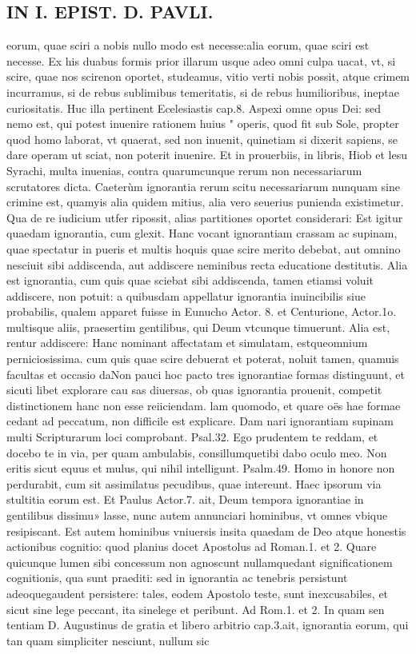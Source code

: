 \documentclass{article}
\begin{document}
\begin{pages}
\section*{IN I. EPIST. D. PAVLI. }
\marginpar{[ p.41 ]}\pstart eorum, quae sciri a nobis nullo modo est necesse:alia eorum, quae sciri est necesse. Ex his duabus formis prior illarum usque  adeo omni culpa uacat, vt, si scire, quae nos scirenon oportet, studeamus, vitio verti nobis possit, atque  crimem incurramus, si de rebus sublimibus temeritatis, si de rebus humilioribus, ineptae curiositatis. Huc illa pertinent Ecelesiastis cap.8. Aspexi omne opus Dei: sed nemo est, qui potest inuenire rationem huius " operis, quod fit sub Sole, propter quod homo laborat, vt quaerat, sed non inuenit, quinetiam si dixerit sapiens, se dare operam ut sciat, non poterit inuenire. Et in prouerbiis, in libris, Hiob et lesu Syrachi, multa inuenias, contra quarumcunque  rerum non necessariarum scrutatores dicta.  \pend\pstart Caeterùm ignorantia rerum scitu necessariarum nunquam sine crimine est, quamyis alia quidem mitius, alia vero seuerius punienda existimetur. Qua de re iudicium utfer ripossit, alias partitiones oportet considerari: Est igitur quaedam ignorantia, cum glexit. Hanc vocant ignorantiam crassam ac supinam, quae spectatur in pueris et multis hoquis quae scire merito debebat, aut omnino nesciuit sibi addiscenda, aut addiscere neminibus recta educatione destitutis. Alia est ignorantia, cum quis quae sciebat sibi addiscenda, tamen etiamsi voluit addiscere, non potuit: a quibusdam appellatur ignorantia inuincibilis siue probabilis, qualem apparet fuisse in Eunucho Actor. 8. et Centurione, Actor.1o. multisque  aliis, praesertim gentilibus, qui Deum vtcunque  timuerunt. Alia est, rentur addiscere: Hanc nominant affectatam et simulatam, estqueomnium perniciosissima. cum quis quae scire debuerat et poterat, noluit tamen, quamuis facultas et occasio daNon pauci hoc pacto tres ignorantiae formas distinguunt, et sicuti libet explorare cau sas diuersas, ob quas ignorantia prouenit, competit distinctionem hanc non esse reiiciendam. lam quomodo, et quare oës hae formae cedant ad peccatum, non difficile est explicare. Dam nari ignorantiam supinam multi Scripturarum loci comprobant. Psal.32. Ego prudentem te reddam, et docebo te in via, per quam ambulabis, consillumquetibi dabo oculo meo. Non eritis sicut equus et mulus, qui nihil intelligunt. Psalm.49. Homo in honore non perdurabit, cum sit assimilatus pecudibus, quae intereunt. Haec ipsorum via stultitia   eorum est. Et Paulus Actor.7. ait, Deum tempora ignorantiae in gentilibus dissimu» lasse, nunc autem annunciari hominibus, vt omnes vbique  resipiscant. Est autem hominibus vniuersis insita quaedam de Deo atque  honestis actionibus cognitio: quod planius docet Apostolus ad Roman.1. et 2. Quare quicunque  lumen sibi concessum non agnoscunt nullamquedant significationem cognitionis, qua sunt praediti: sed in ignorantia ac tenebris persistunt adeoquegaudent persistere: tales, eodem Apostolo teste, sunt inexcusabiles, et sicut sine lege peccant, ita sinelege et peribunt. Ad Rom.1. et 2. In quam sen tentiam D. Augustinus de gratia et libero arbitrio cap.3.ait, ignorantia eorum, qui tan quam simpliciter nesciunt, nullum sic 
\end{pages}
\end{document}
